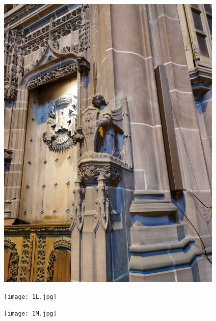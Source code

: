 \documentclass[11pt]{article}
\begin{document}
\begin{figure}[H]
    \centering
    \includegraphics[width=\textwidth]{1K.jpg}
\end{figure}

\begin{figure}[H]
    \centering
    \texttt{[image: 1L.jpg]}
\end{figure}

\begin{figure}[H]
    \centering
    \texttt{[image: 1M.jpg]}
\end{figure}
\end{document}
